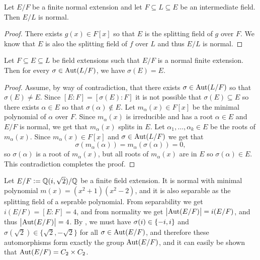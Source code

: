 \documentclass[11pt,a4paper]{article}
\begin{document}
\begin{corollary}
  \label{cor:normal-intermediate-extension}
  Let $E/F$ be a finite normal extension and let $F \subseteq L \subseteq E$
  be an intermediate field.
  Then $E/L$ is normal.
\end{corollary}
\begin{proof}
  There exists $g(x) \in F[x]$ so that $E$ is the splitting field of $g$
  over $F$.
  We know that $E$ is also the splitting field of $f$ over $L$
  and thus $E/L$ is normal.
\end{proof}

\begin{corollary}
  \label{cor:normal-extension-does-not-move}
  Let $F \subseteq E \subseteq L$ be field extensions
  such that $E/F$ is a normal finite extension.
  Then for every $\sigma \in \operatorname{Aut}(L/F)$,
  we have $\sigma(E) = E$.
\end{corollary}
\begin{proof}
  Assume, by way of contradiction,
  that there exists $\sigma \in \operatorname{Aut}(L/F)$ so that $\sigma(E) \neq E$.
  Since $[E : F] = [\sigma(E) : F]$ it is not possible
  that $\sigma(E) \subseteq E$ so there exists $\alpha \in E$
  so that $\sigma(\alpha) \notin E$.
  Let $m_{\alpha}(x) \in F[x]$ be the minimal polynomial of $\alpha$ over $F$.
  Since $m_{\alpha}(x)$ is irreducible and has a root $\alpha \in E$
  and $E/F$ is normal, we get that $m_{\alpha}(x)$ splits in $E$.
  Let $\alpha_1,\dots,\alpha_k \in E$ be the roots of $m_{\alpha}(x)$.
  Since $m_{\alpha}(x) \in F[x]$ and $\sigma \in \operatorname{Aut}(L/F)$ we get that
  \[
    \sigma(m_{\alpha}(\alpha)) = m_{\alpha}(\sigma(\alpha)) = 0,
  \]
    so $\sigma(\alpha)$ is a root of $m_{\alpha}(x)$, but all roots
    of $m_{\alpha}(x)$ are in $E$ so $\sigma(\alpha) \in E$.
    This contradiction completes the proof.
\end{proof}

\begin{example}
  Let $E/F := \mathbb{Q}(i,\sqrt{2})/\mathbb{Q}$ be a finite field extension.
  It is normal with minimal polynomial $m(x) = (x^2 + 1)(x^2 - 2)$,
  and it is also separable as the splitting field of a seprable polynomial.
  From separability we get $i(E/F) = [E : F] = 4$,
  and from normality we get $\left\lvert\operatorname{Aut}(E/F)\right\rvert = i(E/F)$,
  and thus $\left\lvert\operatorname{Aut}(E/F)\right\rvert = 4$.
  By ,
  we must have $\sigma(i) \in \left\{-i,i\right\}$ and
  $\sigma(\sqrt{2}) \in \{\sqrt 2,-\sqrt 2\}$ for all
  $\sigma \in \operatorname{Aut}(E/F)$,
  and therefore these automorphisms form exactly the group $\operatorname{Aut}(E/F)$,
  and it can easily be shown that $\operatorname{Aut}(E/F) = C_2 \times C_2$.
\end{example}
\end{document}
